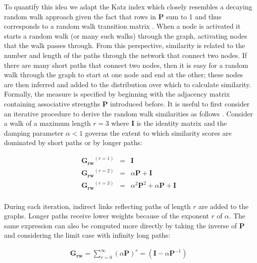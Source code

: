 \documentclass[doc]{apa6}
\begin{document}
To quantify this idea we adapt the Katz index \parencite{Katz1953} which closely resembles a decaying  random walk approach given the fact that rows in $\mathbf{P}$ sum to 1 and thus corresponds to a random walk transition matrix \parencite[see also][]{AbbottAusterweil2015,BorgeHolthoeferArenas2010,Griffiths2007b,Kemeny1976,Leicht2006}. When a node is activated it starts a random walk (or many such walks) through the graph, activating nodes that the walk passes through. From this perspective, similarity is related to the number and length of the paths through the network that connect two nodes. If there are many short paths that connect two nodes, then it is easy for a random walk through the graph to start at one node and end at the other; these nodes are then inferred and added to the distribution over which to calculate similarity. Formally, the measure is specified by beginning with the adjacency matrix containing associative strengths $\mathbf{P}$ introduced before.
It is useful to first consider an iterative procedure to derive the random walk similarities as follows \parencite{Newman2010}. Consider a walk of a maximum length $r = 3$ where $\mathbf{I}$ is the identity matrix and the damping parameter $\alpha < 1$ governs the extent to which similarity scores are dominated by short paths or by longer paths:


\begin{equation}
\begin{array}{lcl}
\mathbf{G_{rw}}^{(r=1)} & = & \mathbf{I}\\
\mathbf{G_{rw}}^{(r=2)} & = & \alpha \mathbf{P} + \mathbf{I}\\
\mathbf{G_{rw}}^{(r=3)} & = & \alpha^2\mathbf{P}^2 + \alpha\mathbf{P} + \mathbf{I}\\
\end{array}
 \label{equation_iteration}
\end{equation}

During each iteration, indirect links reflecting paths of length $r$ are added to the graphs.
Longer paths receive lower weights because of the exponent $r$ of $\alpha$.
The same expression can also be computed more directly by taking the inverse of $\mathbf{P}$ and considering the limit case with infinity long paths:

\begin{equation}
\begin{array}{lcl}
\mathbf{G_{rw}}  = \sum_{r =0}^{\infty}(\alpha\mathbf{P})^r  =   (\mathbf{I} - \alpha \mathbf{P}^{-1})
\end{array}
\label{equation_RW_algebraic}
\end{equation}
\end{document}
